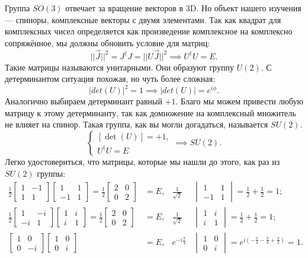Группа $SO(3)$ отвечает за вращение векторов в 3D. Но объект нашего изучения
--- спиноры, комплексные векторы с двумя элементами. Так как квадрат для
комплексных чисел определяется как произведение комплексное на комплексно
сопряжённое, мы должны обновить условие для матриц:
\[
  ||\Vec{J}||^2 = J^{\dagger}J = ||U\Vec{J}||^2 \implies  U^{\dagger}U = E.
\]
Такие матрицы называются унитарными. Они образуют группу $U(2)$. С
детерминантом ситуация похожая, но чуть более сложная:
\[
  |det(U)|^2 = 1 \implies |det(U)| = e^{i\phi}.
\]
Аналогично выбираем детерминант равный $+1$. Благо мы можем привести любую
матрицу к этому детерминанту, так как домножение на комплексный множитель не
влияет на спинор. Такая группа, как вы могли догадаться, называется $SU(2)$.
\[
  \begin{cases}
    [\det(U)] = +1,\\
    U^{\dagger}U = E
  \end{cases} \implies SU(2).
\]
Легко удостовериться, что матрицы, которые мы нашли до этого, как раз из
$SU(2)$ группы:
\begin{align*}
  \frac{1}{2}\begin{bmatrix} 1 & -1 \\ 1 & 1 \end{bmatrix} \begin{bmatrix} 1 & 1 \\ -1 & 1 \end{bmatrix} = \frac{1}{2} \begin{bmatrix} 2 & 0 \\ 0 & 2 \end{bmatrix} &= E, & \frac{1}{\sqrt{2}}&\begin{vmatrix} 1 & 1\\ -1 & 1\end{vmatrix} = \frac{1}{2} + \frac{1}{2} = 1;\\
  \frac{1}{2}\begin{bmatrix} 1 & -i \\ -i & 1 \end{bmatrix}\begin{bmatrix} 1 & i \\ i & 1 \end{bmatrix} = \frac{1}{2}\begin{bmatrix} 2 & 0 \\ 0 & 2 \end{bmatrix} &= E, & \frac{1}{\sqrt{2}}&\begin{vmatrix} 1 & i \\ i & 1 \end{vmatrix} = \frac{1}{2} + \frac{1}{2} = 1;\\
  \begin{bmatrix} 1 & 0 \\ 0 & -i \end{bmatrix}\begin{bmatrix} 1 & 0 \\ 0 & i \end{bmatrix} &= E, & e^{-i\frac{\pi}{4}} &\begin{vmatrix} 1 & 0 \\ 0 & i \end{vmatrix} = e^{i(-\frac{\pi}{4} - \frac{\pi}{4} + \frac{\pi}{2})} = 1.\\
\end{align*}

